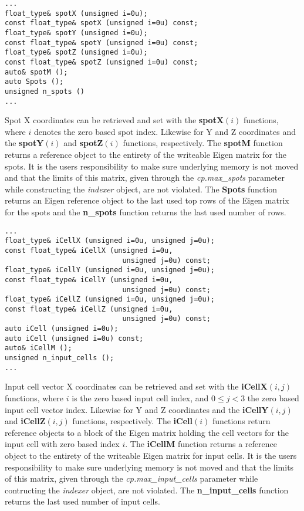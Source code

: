\documentclass[a4paper,10pt]{article}
\begin{document}
\begin{lstlisting}
...
float_type& spotX (unsigned i=0u);
const float_type& spotX (unsigned i=0u) const;
float_type& spotY (unsigned i=0u);
const float_type& spotY (unsigned i=0u) const;
float_type& spotZ (unsigned i=0u);
const float_type& spotZ (unsigned i=0u) const;
auto& spotM ();
auto Spots ();
unsigned n_spots ()
...
\end{lstlisting}

Spot X coordinates can be retrieved and set with the \textbf{spotX}$(i)$ functions, where $i$ denotes the zero based spot index. Likewise for Y and Z coordinates and the \textbf{spotY}$(i)$ and \textbf{spotZ}$(i)$ functions, respectively. The \textbf{spotM} function returns a reference object to the entirety of the writeable Eigen matrix for the spots. It is the users responsibility to make sure underlying memory is not moved and that the limits of this matrix, given through the \emph{cp.max\_spots} parameter while constructing the \emph{indexer} object, are not violated. The \textbf{Spots} function returns an Eigen reference object to the last used top rows of the Eigen matrix for the spots and the \textbf{n\_spots} function returns the last used number of rows.

\begin{lstlisting}
...
float_type& iCellX (unsigned i=0u, unsigned j=0u);
const float_type& iCellX (unsigned i=0u,
                            unsigned j=0u) const;
float_type& iCellY (unsigned i=0u, unsigned j=0u);
const float_type& iCellY (unsigned i=0u,
                            unsigned j=0u) const;
float_type& iCellZ (unsigned i=0u, unsigned j=0u);
const float_type& iCellZ (unsigned i=0u,
                            unsigned j=0u) const;
auto iCell (unsigned i=0u);
auto iCell (unsigned i=0u) const;
auto& iCellM ();
unsigned n_input_cells ();
...
\end{lstlisting}

Input cell vector X coordinates can be retrieved and set with the \textbf{iCellX}$(i,j)$ functions, where $i$ is the zero based input cell index, and $0\leq j<3$ the zero based input cell vector index. Likewise for Y and Z coordinates and the \textbf{iCellY}$(i,j)$ and \textbf{iCellZ}$(i,j)$ functions, respectively. The \textbf{iCell}$(i)$ functions return reference objects to a block of the Eigen matrix holding the cell vectors for the input cell with zero based index $i$. The \textbf{iCellM} function returns a reference object to the entirety of the writeable Eigen matrix for input cells. It is the users responsibility to make sure underlying memory is not moved and that the limits of this matrix, given through the \emph{cp.max\_input\_cells} parameter while contructing the \emph{indexer} object, are not violated. The \textbf{n\_input\_cells} function returns the last used number of input cells.
\end{document}
